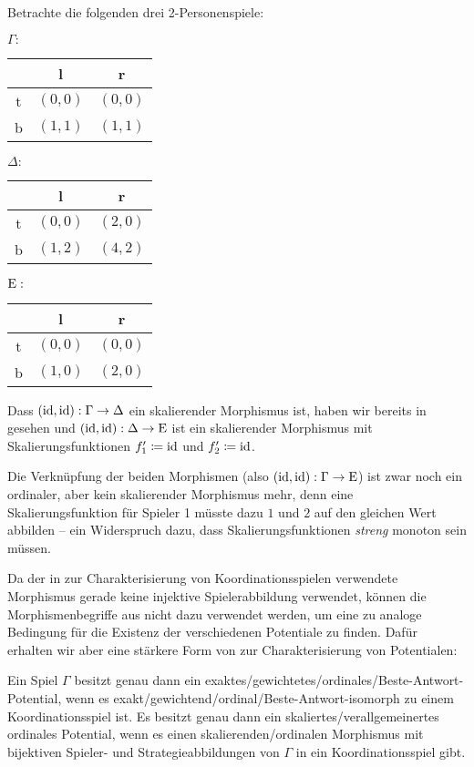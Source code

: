 \begin{bsp}\label{bsp:GegenbspKompositionSkMorphismen}
	Betrachte die folgenden drei 2-Personenspiele:
	\begin{center}
		$\Gamma:$ \quad
		\begin{tabular}{c||c|c}
			& l 		& r 		\\\hline\hline
			t	& $(0,0)$	& $(0,0)$	\\\hline
			b	& $(1,1)$	& $(1,1)$ 
		\end{tabular}\hspace{3em}
		$\Delta:$ \quad
		\begin{tabular}{c||c|c}
			& l 		& r 		\\\hline\hline
		t	& $(0,0)$	& $(2,0)$	\\\hline
		b	& $(1,2)$	& $(4,2)$ 
		\end{tabular}\hspace{3em}
		$\mathrm{E}:$ \quad
		\begin{tabular}{c||c|c}
			& l 		& r 		\\\hline\hline
			t	& $(0,0)$	& $(0,0)$	\\\hline
			b	& $(1,0)$	& $(2,0)$ 
		\end{tabular}
	\end{center}
	Dass $(\mathrm{id}, \mathrm{id}): \Gamma \to \Delta$ ein skalierender Morphismus ist, haben wir bereits in  gesehen und $(\mathrm{id}, \mathrm{id}): \Delta \to \mathrm{E}$ ist ein skalierender Morphismus mit Skalierungsfunktionen $f'_1 \coloneqq \mathrm{id}$ und $f'_2 \coloneqq \mathrm{id}$. 
	
	Die Verknüpfung der beiden Morphismen (also $(\mathrm{id}, \mathrm{id}): \Gamma \to \mathrm{E}$) ist zwar noch ein ordinaler, aber kein skalierender Morphismus mehr, denn eine Skalierungsfunktion für Spieler 1 müsste dazu $1$ und $2$ auf den gleichen Wert abbilden -- ein Widerspruch dazu, dass Skalierungsfunktionen \emph{streng} monoton sein müssen.
\end{bsp}


Da der in  zur Charakterisierung von Koordinationsspielen verwendete Morphismus gerade keine injektive Spielerabbildung verwendet, können die Morphismenbegriffe aus  nicht dazu verwendet werden, um eine zu  analoge Bedingung für die Existenz der verschiedenen Potentiale zu finden. Dafür erhalten wir aber eine stärkere Form von  zur Charakterisierung von Potentialen:

\begin{prop}\label{prop:CharPotentialeDurchIsos}
	Ein Spiel $\Gamma$ besitzt genau dann ein exaktes/gewichtetes/ordinales/Beste-Antwort-Potential, wenn es exakt/gewichtend/ordinal/Beste-Antwort-isomorph zu einem Koordinationsspiel ist. Es besitzt genau dann ein skaliertes/verallgemeinertes ordinales Potential, wenn es einen skalierenden/ordinalen Morphismus mit bijektiven Spieler- und Strategieabbildungen von $\Gamma$ in ein Koordinationsspiel gibt.
\end{prop}

